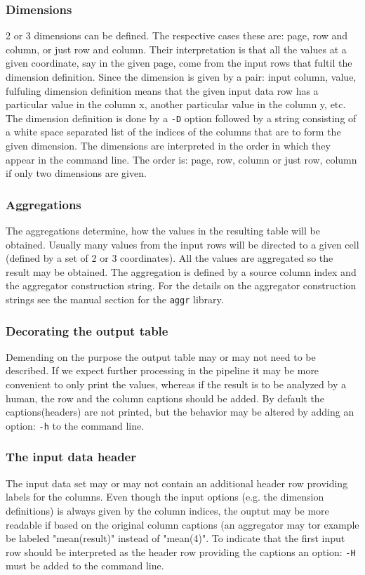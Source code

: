 \documentclass{report}
\begin{document}
	\subsubsection{Dimensions}
	2 or 3 dimensions can be defined. The respective cases these are: page, row
	and column, or just row and column. Their interpretation is that all the values
	at a given coordinate, say in the given page, come from the input rows that fultil
	the dimension definition. Since the dimension is given by a pair: input column,
	value, fulfuling dimension definition means that the given input data row has
	a particular value in the column x, another particular value in the column y, etc.
	The dimension definition is done by a \texttt{-D} option followed by a string
	consisting of a white space separated list of the indices of the columns that are
	to form the given dimension. The dimensions are interpreted in the order in which
	they appear in the command line. The order is: page, row, column or just row, column
	if only two dimensions are given.

	\subsubsection{Aggregations}
	The aggregations determine, how the values in the resulting table will be obtained.
	Usually many values from the input rows will be directed to a given cell (defined
	by a set of 2 or 3 coordinates). All the values are aggregated so the result may
	be obtained. The aggregation is defined by a source column index and the aggregator
	construction string. For the details on the aggregator construction strings see
	the manual section for the \texttt{aggr} library.

	\subsubsection{Decorating the output table}
	Demending on the purpose the output table may or may not need to be described. If
	we expect further processing in the pipeline it may be more convenient to only
	print the values, whereas if the result is to be analyzed by a human, the row and
	the column captions should be added. By default the captions(headers) are not
	printed, but the behavior may be altered by adding an option: \texttt{-h} to the
	command line.

	\subsubsection{The input data header}
	The input data set may or may not contain an additional header row providing
	labels for the columns. Even though the input options (e.g. the dimension
	definitions) is always given by the column indices, the ouptut may be more
	readable if based on the original column captions (an aggregator may tor example
	be labeled "mean(result)" instead of "mean(4)". To indicate that the first input
	row should be interpreted as the header row providing the captions an option:
	\texttt{-H} must be added to the command line.
\end{document}
